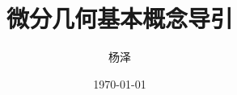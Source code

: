 \documentclass[12pt,a4paper,oneside,openany]{book}
\begin{document}
	
	\title{
		\Huge\textbf{微分几何基本概念导引}\\[0.6em]
		\Large\color{gray}{对象·关系·结构·表示}
	}
	\author{杨泽}
	\date{\today}
	
	\maketitle
	
	\tableofcontents
	\clearpage
	
	
	
	
	
	
	
	
	
	\appendix
	
\end{document}
